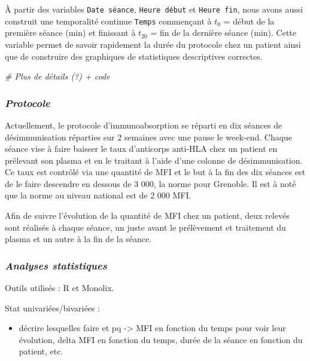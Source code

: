 \documentclass[
]{article}
\newenvironment{Shaded}{\begin{snugshade}}{\end{snugshade}}
\newcommand{\CommentTok}[1]{\textcolor[rgb]{0.56,0.35,0.01}{\textit{#1}}}
\providecommand{\tightlist}{%
  \setlength{\itemsep}{0pt}\setlength{\parskip}{0pt}}
\begin{document}
À partir des variables \texttt{Date\ séance}, \texttt{Heure\ début} et
\texttt{Heure\ fin}, nous avons aussi construit une temporalité continue
\texttt{Temps} commençant à \(t_0\) = début de la première séance (min)
et finissant à \(t_{20}\) = fin de la dernière séance (min). Cette
variable permet de savoir rapidement la durée du protocole chez un
patient ainsi que de construire des graphiques de statistiques
descriptives correctes.

\begin{Shaded}
\begin{Highlighting}[]
\CommentTok{\# Plus de détails (?) + code}
\end{Highlighting}
\end{Shaded}

\subsubsection{\texorpdfstring{\emph{Protocole}}{Protocole}}\label{protocole}

Actuellement, le protocole d'immunoabsorption se réparti en dix séances
de désimmunisation réparties sur 2 semaines avec une pause le week-end.
Chaque séance vise à faire baisser le taux d'anticorps anti-HLA chez un
patient en prélevant son plasma et en le traitant à l'aide d'une colonne
de désimmunisation. Ce taux est contrôlé via une quantité de MFI et le
but à la fin des dix séances est de le faire descendre en dessous de 3
000, la norme pour Grenoble. Il est à noté que la norme au niveau
national est de 2 000 MFI.

Afin de suivre l'évolution de la quantité de MFI chez un patient, deux
relevés sont réalisés à chaque séance, un juste avant le prélèvement et
traitement du plasma et un autre à la fin de la séance.

\subsubsection{\texorpdfstring{\emph{Analyses
statistiques}}{Analyses statistiques}}\label{analyses-statistiques}

Outils utilisés : R et Monolix.

Stat univariées/bivariées :

\begin{itemize}
\tightlist
\item
  décrire lesquelles faire et pq -\textgreater{} MFI en fonction du
  temps pour voir leur évolution, delta MFI en fonction du temps, durée
  de la séance en fonction du patient, etc.
\end{itemize}
\end{document}
